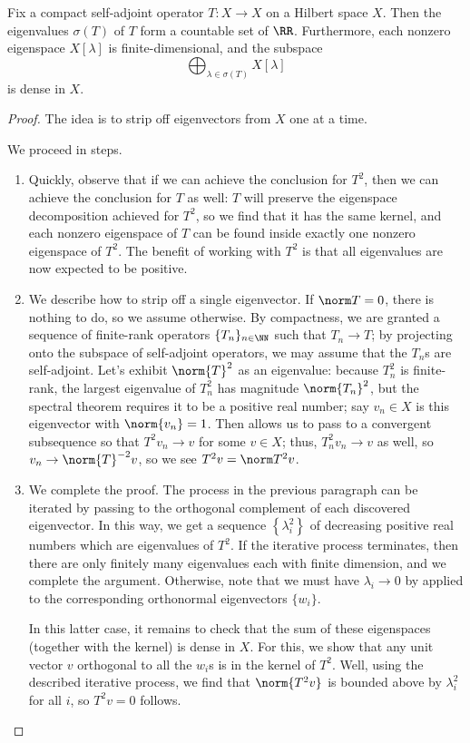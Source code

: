 \documentclass{amsart}
\begin{document}
\begin{theorem} \label{thm:hs}
	Fix a compact self-adjoint operator $T\colon X\to X$ on a Hilbert space $X$. Then the eigenvalues $\sigma(T)$ of $T$ form a countable set of $\RR$. Furthermore, each nonzero eigenspace $X[\lambda]$ is finite-dimensional, and the subspace
	\[\bigoplus_{\lambda\in\sigma(T)}X[\lambda]\]
	is dense in $X$.
\end{theorem}
\begin{proof}
	The idea is to strip off eigenvectors from $X$ one at a time.
	
	We proceed in steps.
	\begin{enumerate}
		\item Quickly, observe that if we can achieve the conclusion for $T^2$, then we can achieve the conclusion for $T$ as well: $T$ will preserve the eigenspace decomposition achieved for $T^2$, so we find that it has the same kernel, and each nonzero eigenspace of $T$ can be found inside exactly one nonzero eigenspace of $T^2$. The benefit of working with $T^2$ is that all eigenvalues are now expected to be positive.

		\item We describe how to strip off a single eigenvector. If $\norm T=0$, there is nothing to do, so we assume otherwise. By compactness, we are granted a sequence of finite-rank operators $\{T_n\}_{n\in\NN}$ such that $T_n\to T$; by projecting onto the subspace of self-adjoint operators, we may assume that the $T_n$s are self-adjoint. Let's exhibit $\norm{T}^2$ as an eigenvalue: because $T_n^2$ is finite-rank, the largest eigenvalue of $T_n^2$ has magnitude $\norm{T_n}^2$, but the spectral theorem requires it to be a positive real number; say $v_n\in X$ is this eigenvector with $\norm {v_n}=1$. Then  allows us to pass to a convergent subsequence so that $T^2v_n\to v$ for some $v\in X$; thus, $T_n^2v_n\to v$ as well, so $v_n\to\norm{T}^{-2}v$, so we see $T^2v=\norm T^2v$.

		\item We complete the proof. The process in the previous paragraph can be iterated by passing to the orthogonal complement of each discovered eigenvector. In this way, we get a sequence $\left\{\lambda_i^2\right\}$ of decreasing positive real numbers which are eigenvalues of $T^2$. If the iterative process terminates, then there are only finitely many eigenvalues each with finite dimension, and we complete the argument. Otherwise, note that we must have $\lambda_i\to0$ by  applied to the corresponding orthonormal eigenvectors $\{w_i\}$.

		In this latter case, it remains to check that the sum of these eigenspaces (together with the kernel) is dense in $X$. For this, we show that any unit vector $v$ orthogonal to all the $w_i$s is in the kernel of $T^2$. Well, using the described iterative process, we find that $\norm{T^2v}$ is bounded above by $\lambda_i^2$ for all $i$, so $T^2v=0$ follows.
		\qedhere
	\end{enumerate}
\end{proof}
\end{document}
